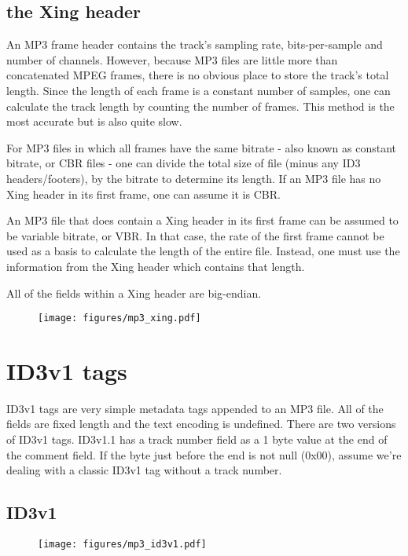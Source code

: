 \subsection{the Xing header}

An MP3 frame header contains the track's sampling rate,
bits-per-sample and number of channels.
However, because MP3 files are little more than
concatenated MPEG frames, there is no obvious place to
store the track's total length.
Since the length of each frame is a constant number of samples,
one can calculate the track length by counting the number of frames.
This method is the most accurate but is also quite slow.

For MP3 files in which all frames have the same bitrate
- also known as constant bitrate, or CBR files -
one can divide the total size of file (minus any ID3 headers/footers),
by the bitrate to determine its length.
If an MP3 file has no Xing header in its first frame,
one can assume it is CBR.

An MP3 file that does contain a Xing header in its first frame
can be assumed to be variable bitrate, or VBR.
In that case, the rate of the first frame cannot be used as a
basis to calculate the length of the entire file.
Instead, one must use the information from the Xing header
which contains that length.

All of the fields within a Xing header are big-endian.
\begin{figure}[h]
\texttt{[image: figures/mp3\_xing.pdf]}
\end{figure}

\section{ID3v1 tags}
ID3v1 tags are very simple metadata tags appended to an MP3 file.
All of the fields are fixed length and the text encoding is
undefined.
There are two versions of ID3v1 tags.
ID3v1.1 has a track number field as a 1 byte value
at the end of the comment field.
If the byte just before the end is not null (0x00),
assume we're dealing with a classic ID3v1 tag without a
track number.

\subsection{ID3v1}

\begin{figure}[h]
\texttt{[image: figures/mp3\_id3v1.pdf]}
\end{figure}

